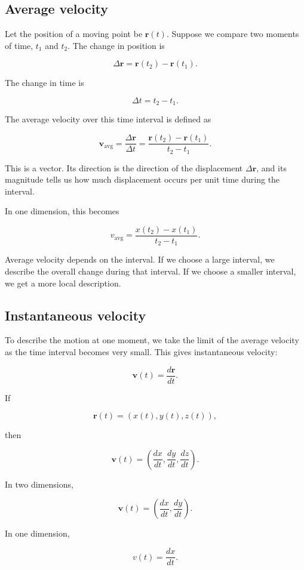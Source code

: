\subsection{Average velocity}

Let the position of a moving point be \(\mathbf{r}(t)\). Suppose we compare two moments of time, \(t_1\) and \(t_2\). The change in position is

\[
\Delta \mathbf{r} = \mathbf{r}(t_2)-\mathbf{r}(t_1).
\]

The change in time is

\[
\Delta t = t_2-t_1.
\]

The average velocity over this time interval is defined as

\[
\mathbf{v}_{\mathrm{avg}}
=
\frac{\Delta \mathbf{r}}{\Delta t}
=
\frac{\mathbf{r}(t_2)-\mathbf{r}(t_1)}{t_2-t_1}.
\]

This is a vector. Its direction is the direction of the displacement \(\Delta \mathbf{r}\), and its magnitude tells us how much displacement occurs per unit time during the interval.

In one dimension, this becomes

\[
v_{\mathrm{avg}}
=
\frac{x(t_2)-x(t_1)}{t_2-t_1}.
\]

Average velocity depends on the interval. If we choose a large interval, we describe the overall change during that interval. If we choose a smaller interval, we get a more local description.

\subsection{Instantaneous velocity}

To describe the motion at one moment, we take the limit of the average velocity as the time interval becomes very small. This gives instantaneous velocity:

\[
\mathbf{v}(t)
=
\frac{d\mathbf{r}}{dt}.
\]

If

\[
\mathbf{r}(t)=(x(t),y(t),z(t)),
\]

then

\[
\mathbf{v}(t)
=
\left(
\frac{dx}{dt},
\frac{dy}{dt},
\frac{dz}{dt}
\right).
\]

In two dimensions,

\[
\mathbf{v}(t)
=
\left(
\frac{dx}{dt},
\frac{dy}{dt}
\right).
\]

In one dimension,

\[
v(t)=\frac{dx}{dt}.
\]


